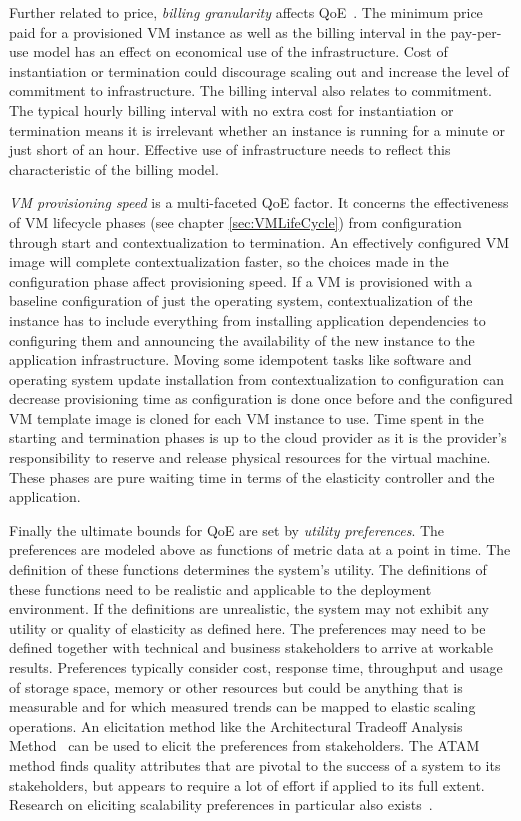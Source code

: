 \documentclass[english]{tktltiki2}
\theoremstyle{definition}
\theoremstyle{remark}
\begin{document}
Further related to price, \textit{billing granularity} affects
QoE~\cite{Brebner2012a}\cite{Islam2012}\cite{Mao2011}\cite{VandenBossche2010}.
The minimum price paid for a provisioned VM instance as well as the billing
interval in the pay-per-use model has an effect on economical use of the
infrastructure. Cost of instantiation or termination could discourage scaling
out and increase the level of commitment to infrastructure. The billing interval
also relates to commitment. The typical hourly billing interval with no extra
cost for instantiation or termination means it is irrelevant whether an instance
is running for a minute or just short of an hour. Effective use of
infrastructure needs to reflect this characteristic of the billing model.

\textit{VM provisioning speed} is a multi-faceted QoE factor. It concerns the
effectiveness of VM lifecycle phases (see chapter \ref{sec:VMLifeCycle}) from
configuration through start and contextualization to termination. An effectively
configured VM image will complete contextualization faster, so the choices made
in the configuration phase affect provisioning speed. If a VM is provisioned
with a baseline configuration of just the operating system, contextualization of
the instance has to include everything from installing application dependencies
to configuring them and announcing the availability of the new instance to the
application infrastructure. Moving some idempotent tasks like software and
operating system update installation from contextualization to configuration can
decrease provisioning time as configuration is done once before and the
configured VM template image is cloned for each VM instance to use. Time spent
in the starting and termination phases is up to the cloud provider as it is the
provider's responsibility to reserve and release physical resources for the
virtual machine. These phases are pure waiting time in terms of the elasticity
controller and the application.

Finally the ultimate bounds for QoE are set by \textit{utility preferences}.
The preferences are modeled above as functions of metric data at a point in
time. The definition of these functions determines the system's utility. The
definitions of these functions need to be realistic and applicable to the
deployment environment. If the definitions are unrealistic, the system may not
exhibit any utility or quality of elasticity as defined here. The preferences
may need to be defined together with technical and business stakeholders to
arrive at workable results. Preferences typically consider cost, response
time, throughput and usage of storage space, memory or other resources but
could be anything that is measurable and for which measured trends can be
mapped to elastic scaling operations. An elicitation method like the
Architectural Tradeoff Analysis Method~\cite{ATAM} can be used to elicit the
preferences from stakeholders. The ATAM method finds quality attributes that
are pivotal to the success of a system to its stakeholders, but appears to
require a lot of effort if applied to its full extent. Research on eliciting
scalability preferences in particular also exists~\cite{DubocUtility}.
\end{document}
